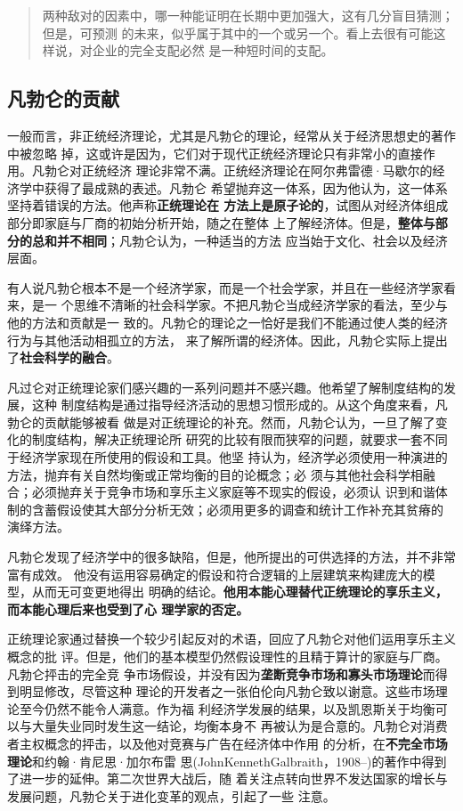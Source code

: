 \begin{quotation}
  两种敌对的因素中，哪一种能证明在长期中更加强大，这有几分盲目猜测；但是，可预测
  的未来，似乎属于其中的一个或另一个。看上去很有可能这样说，对企业的完全支配必然
  是一种短时间的支配。
\end{quotation}

\subsection{凡勃仑的贡献}

一般而言，非正统经济理论，尤其是凡勃仑的理论，经常从关于经济思想史的著作中被忽略
掉，这或许是因为，它们对于现代正统经济理论只有非常小的直接作用。凡勃仑对正统经济
理论非常不满。正统经济理论在阿尔弗雷德·马歇尔的经济学中获得了最成熟的表述。凡勃仑
希望抛弃这一体系，因为他认为，这一体系坚持着错误的方法。他声称\textbf{正统理论在
  方法上是原子论的}，试图从对经济体组成部分即家庭与厂商的初始分析开始，随之在整体
上了解经济体。但是，\textbf{整体与部分的总和并不相同}；凡勃仑认为，一种适当的方法
应当始于文化、社会以及经济层面。

有人说凡勃仑根本不是一个经济学家，而是一个社会学家，并且在一些经济学家看来，是一
个思维不清晰的社会科学家。不把凡勃仑当成经济学家的看法，至少与他的方法和贡献是一
致的。凡勃仑的理论之一恰好是我们不能通过使人类的经济行为与其他活动相孤立的方法，
来了解所谓的经济体。因此，凡勃仑实际上提出了\textbf{社会科学的融合}。

凡过仑对正统理论家们感兴趣的一系列问题并不感兴趣。他希望了解制度结构的发展，这种
制度结构是通过指导经济活动的思想习惯形成的。从这个角度来看，凡勃仑的贡献能够被看
做是对正统理论的补充。然而，凡勃仑认为，一旦了解了变化的制度结构，解决正统理论所
研究的比较有限而狭窄的问题，就要求一套不同于经济学家现在所使用的假设和工具。他坚
持认为，经济学必须使用一种演进的方法，抛弃有关自然均衡或正常均衡的目的论概念；必
须与其他社会科学相融合；必须抛弃关于竞争市场和享乐主义家庭等不现实的假设，必须认
识到和谐体制的含蓄假设使其大部分分析无效；必须用更多的调查和统计工作补充其贫瘠的
演绎方法。

凡勃仑发现了经济学中的很多缺陷，但是，他所提出的可供选择的方法，并不非常富有成效。
他没有运用容易确定的假设和符合逻辑的上层建筑来构建庞大的模型，从而无可变更地得出
明确的结论。\textbf{他用本能心理替代正统理论的享乐主义，而本能心理后来也受到了心
  理学家的否定。}

正统理论家通过替换一个较少引起反对的术语，回应了凡勃仑对他们运用享乐主义概念的批
评。但是，他们的基本模型仍然假设理性的且精于算计的家庭与厂商。凡勃仑抨击的完全竞
争市场假设，并没有因为\textbf{垄断竞争市场和寡头市场理论}而得到明显修改，尽管这种
理论的开发者之一张伯伦向凡勃仑致以谢意。这些市场理论至今仍然不能令人满意。作为福
利经济学发展的结果，以及凯恩斯关于均衡可以与大量失业同时发生这一结论，均衡本身不
再被认为是合意的。凡勃仑对消费者主权概念的抨击，以及他对竞赛与广告在经济体中作用
的分析，在\textbf{不完全市场理论}和约翰·肯尼思·加尔布雷
思(JohnKennethGalbraith，1908--)的著作中得到了进一步的延伸。第二次世界大战后，随
着关注点转向世界不发达国家的增长与发展问题，凡勃仑关于进化变革的观点，引起了一些
注意。

